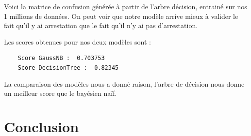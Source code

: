 \documentclass{article}
\begin{document}
    Voici la matrice de confusion générée à partir de l'arbre décision, entrainé sur
    nos 1 millions de données. On peut voir que notre modèle arrive mieux à valider
    le fait qu'il y ai arrestation que le fait qu'il n'y ai pas d'arrestation.

    Les scores obtenues pour nos deux modèles sont :
    \begin{Verbatim}
    Score GaussNB :  0.703753
    Score DecisionTree :  0.82345
    \end{Verbatim}

    La comparaison des modèles nous a donné raison, l'arbre de décision nous donne
    un meilleur score que le bayésien naïf.

    \section{Conclusion}
\end{document}
